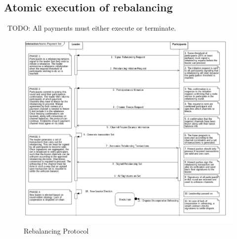 \documentclass[12pt]{article}
\newcommand{\todo}[1]{{\color{red}\ TODO: {#1}}}
\begin{document}
\subsection{Atomic execution of rebalancing}
\todo{All payments must either execute or terminate.}

\begin{figure}[H]
\centering
\includegraphics[width=\textwidth]{protocol}
\caption{Rebalancing Protocol}
\end{figure}




\end{document}

